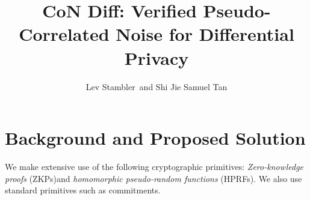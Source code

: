 \documentclass[11pt]{article}
\newcommand{\myname}{Lev Stambler}
\begin{document}
\title{CoN Diff: Verified Pseudo-Correlated Noise for Differential Privacy}

\author{\myname\ and Shi Jie Samuel Tan}

\date{}
\maketitle








\section{Background and Proposed Solution}
We make extensive use of the following cryptographic primitives: \emph{Zero-knowledge proofs} (ZKPs)and \emph{homomorphic pseudo-random functions} (HPRFs).
We also use standard primitives such as commitments.




\end{document}
